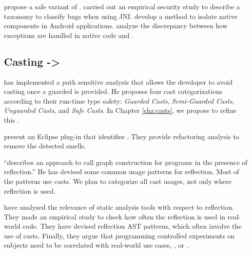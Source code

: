 \cite{tanSafeJavaNative2006} propose a safe variant of \jni{}.
\cite{tanEmpiricalSecurityStudy2008,kondohFindingBugsJava2008} carried out an empirical security study to describe a taxonomy to classify bugs when using JNI.
\cite{sunNativeGuardProtectingAndroid2014} develop a method to isolate native components in Android applications.
\cite{liFindingBugsExceptional2009} analyze the discrepancy between how exceptions are handled in native code and \java{}.


\subsection*{Casting -> }
\label{sec:lr:casting}

\cite{wintherGuardedTypePromotion2011} has implemented a path sensitive analysis that allows the developer to avoid casting once a guarded  is provided.
He proposes four cast categorizations according to their run-time type safety: \emph{Guarded Casts}, \emph{Semi-Guarded Casts}, \emph{Unguarded Casts}, and \emph{Safe Casts}.
In Chapter \ref{cha:casts}, we propose to refine this
.

\cite{tsantalisJDeodorantIdentificationRemoval2008} present an Eclipse plug-in that identifies
.
They provide refactoring analysis to remove the detected smells.

\cite{livshitsImprovingSoftwareSecurity2006,livshitsReflectionAnalysisJava2005} ``describes an approach to call graph construction for \java{} programs in the presence of reflection.''
He has devised some common usage patterns for reflection.
Most of the patterns use casts.
We plan to categorize all cast usages, not only where reflection is used.

\cite{landmanChallengesStaticAnalysis2017} have analyzed the relevance of static analysis tools with respect to reflection.
They made an empirical study to check how often the reflection \api{} is used in real-world code.
They have devised reflection AST patterns, which often involve the use of casts.
Finally, they argue that programming controlled experiments on subjects need to be correlated with real-world use cases, \eg{}, \github{} or \mavencentral{}.


